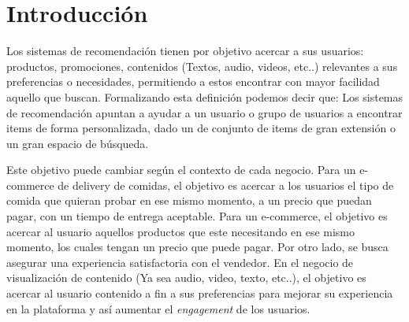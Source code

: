 \documentclass[11pt,a4paper,twoside]{thesis}
\begin{document}

\def\autor{Adrian Norberto Marino}
\def\tituloTesis{Sistemas de recomendación colaborativos}
\def\runtitulo{Resumen}
\def\runtitle{Sistemas de recomendación colaborativos}



\def\lugar{Buenos Aires, 2022}


%
\frontmatter
\pagestyle{empty}

%
%
%
%
%
\tableofcontents
%
%
\mainmatter
\pagestyle{headings}
%
%
%
%


\chapter{Introducción}

Los sistemas de recomendación tienen por objetivo acercar a sus usuarios: productos, promociones, contenidos (Textos,  audio, videos, etc..) relevantes a sus preferencias o necesidades, permitiendo a estos encontrar con mayor facilidad aquello que buscan. Formalizando esta definición podemos decir que: Los sistemas de recomendación apuntan a ayudar a un usuario o grupo de usuarios a encontrar items de forma personalizada, dado un de conjunto de items de gran extensión o un gran espacio de búsqueda.

Este objetivo puede cambiar según el contexto de cada negocio. Para un e-commerce de delivery de comidas, el objetivo es acercar a los usuarios el tipo de comida que quieran probar en ese mismo momento, a un precio que puedan pagar, con un tiempo de entrega aceptable. Para un e-commerce, el objetivo es acercar al usuario aquellos productos que este necesitando en ese mismo momento, los cuales tengan un precio que puede pagar. Por otro lado, se busca asegurar una experiencia satisfactoria con el vendedor. En el negocio de visualización de contenido (Ya sea audio, video, texto, etc..), el objetivo es acercar al usuario contenido a fin a sus preferencias para mejorar su experiencia en la plataforma y así aumentar el \textit{engagement} de los usuarios.
\end{document}
